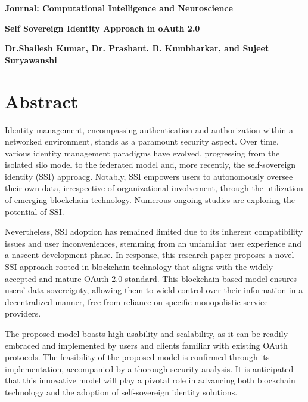 \thispagestyle{plain}
\begin{center}
    \Large
    \textbf{Journal: Computational Intelligence and Neuroscience}
    \vspace{0.4cm}
    
    \textbf{Self Sovereign Identity Approach in oAuth 2.0}
    \vspace{0.4cm}
    \large
    
    \vspace{0.4cm}
    
    \textbf{Dr.Shailesh Kumar, Dr. Prashant. B. Kumbharkar, and Sujeet Suryawanshi}
       
    \vspace{0.9cm}
\end{center}
\section*{Abstract}

Identity management, encompassing authentication and authorization within a networked environment, stands as a paramount security aspect. Over time, various identity management paradigms have evolved, progressing from the isolated silo model to the federated model and, more recently, the self-sovereign identity (SSI) approacg. Notably, SSI empowers users to autonomously oversee their own data, irrespective of organizational involvement, through the utilization of emerging blockchain technology. Numerous ongoing studies are exploring the potential of SSI.

Nevertheless, SSI adoption has remained limited due to its inherent compatibility issues and user inconveniences, stemming from an unfamiliar user experience and a nascent development phase. In response, this research paper proposes a novel SSI approach rooted in blockchain technology that aligns with the widely accepted and mature OAuth 2.0 standard. This blockchain-based model ensures users' data sovereignty, allowing them to wield control over their information in a decentralized manner, free from reliance on specific monopolistic service providers.

The proposed model boasts high usability and scalability, as it can be readily embraced and implemented by users and clients familiar with existing OAuth protocols. The feasibility of the proposed model is confirmed through its implementation, accompanied by a thorough security analysis. It is anticipated that this innovative model will play a pivotal role in advancing both blockchain technology and the adoption of self-sovereign identity solutions.


